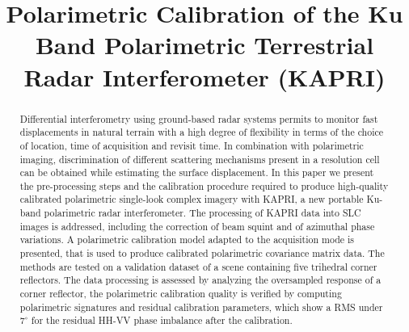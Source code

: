 \documentclass[12pt]{IEEEtran}
\title{Polarimetric Calibration of the Ku Band Polarimetric Terrestrial Radar Interferometer (KAPRI)}
\author{\IEEEauthorblockN{
	Simone Baffelli,
	Othmar Frey,
	Charles Werner,
	Irena Hajnsek
}}
\begin{document}
\maketitle
\begin{abstract}
Differential interferometry using ground-based radar systems permits to monitor fast displacements in natural terrain with a high degree of flexibility in terms of the choice of location, time of acquisition and revisit time. In combination with polarimetric imaging, discrimination of different scattering mechanisms present in a resolution cell can be obtained while estimating the surface displacement.
In this paper we present the pre-processing steps and the calibration procedure required to produce high-quality calibrated polarimetric single-look complex imagery with KAPRI, a new portable Ku-band polarimetric radar interferometer. The processing of KAPRI data into SLC images is addressed, including the correction of beam squint and of azimuthal phase variations. A polarimetric calibration model adapted to the acquisition mode is presented, that is used to produce calibrated polarimetric covariance matrix data. The methods are tested on a validation dataset of a scene containing five trihedral corner reflectors. The data processing is assessed by analyzing the oversampled response of a corner reflector, the polarimetric calibration quality is verified by computing polarimetric signatures and residual calibration parameters, which show a RMS under $\mathrm{7^\circ}$ for the residual HH-VV phase imbalance after the calibration.
\end{abstract}





\pagebreak


\end{document}

